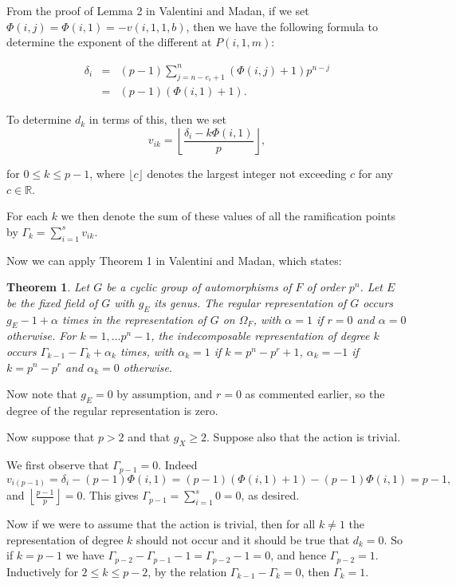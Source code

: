 \documentclass[11pt]{article} %
\newtheorem{thm}{Theorem}
\theoremstyle{remark}\newtheorem*{rem}{Remark}
\begin{document}
From the proof of Lemma 2 in Valentini and Madan, if we set $\Phi(i,j) = \Phi(i,1) = -v(i,1,1,b)$, then we have the following formula to determine the exponent of the different at $P(i,1,m)$:

\begin{eqnarray}\label{eq}
\delta_i & = & (p-1)\sum_{j=n-e_i+1}^n (\Phi(i,j) + 1)p^{n-j} \\
	    & = & (p-1)(\Phi(i,1) + 1).
\end{eqnarray}

To determine $d_k$ in terms of this, then we set 
\[
v_{ik} = \left\lfloor \frac{\delta_i - k\Phi(i,1)}{p} \right\rfloor,
\]

for $0\leq k \leq p-1$, where $\lfloor c \rfloor$ denotes the largest integer not exceeding $c$ for any $c\in \mathbb{R}$.

For each $k$ we then denote the sum of these values of all the ramification points by $ \Gamma_k = \sum_{i=1}^s v_{ik}.$

Now we can apply Theorem 1 in Valentini and Madan, which states:\\
\begin{thm}
Let $G$ be a cyclic group of automorphisms of $F$ of order $p^n$. 
Let $E$ be the fixed field of $G$ with $g_E$ its genus.
The regular representation of $G$ occurs $g_E-1+\alpha$ times in the representation of $G$ on $\Omega_F$, with $\alpha = 1$ if $r=0$ and $\alpha = 0$ otherwise.
For $k=1,\ldots p^n-1$, the indecomposable representation of degree $k$ occurs $\Gamma_{k-1}-\Gamma_k + \alpha_k$ times, with $\alpha_k = 1$ if $k= p^n-p^r +1$, $\alpha_k = -1$ if $k=p^n-p^r$ and $\alpha_k = 0$ otherwise.
\end{thm}

Now note that $g_E=0$ by assumption, and $r=0$ as commented earlier, so the degree of the regular representation is zero.

Now suppose that $p>2$ and that $g_X\geq 2$.
Suppose also that the action is trivial.


We first observe that $\Gamma_{p-1} = 0$. Indeed
\[
 v_{i(p-1)} = \delta_i - (p-1)\Phi(i,1) = (p-1)(\Phi(i,1) + 1) - (p-1)\Phi(i,1) = p-1,
\]
and $\left \lfloor \frac{p-1}{p} \right\rfloor = 0$. This gives $\Gamma_{p-1} = \sum_{i=1}^s 0 = 0$, as desired.

Now if we were to assume that the action is trivial, then for all $k\neq 1$ the representation of degree $k$ should not occur and it should be true that $d_k = 0$.
So if $k= p-1$ we have $\Gamma_{p-2} - \Gamma_{p-1} - 1 = \Gamma_{p-2} -1 = 0$, and hence $\Gamma_{p-2} = 1$.
Inductively for $2\leq k \leq p-2$, by the relation $\Gamma_{k-1} - \Gamma_k =0$, then $\Gamma_k = 1$.
\end{document}
